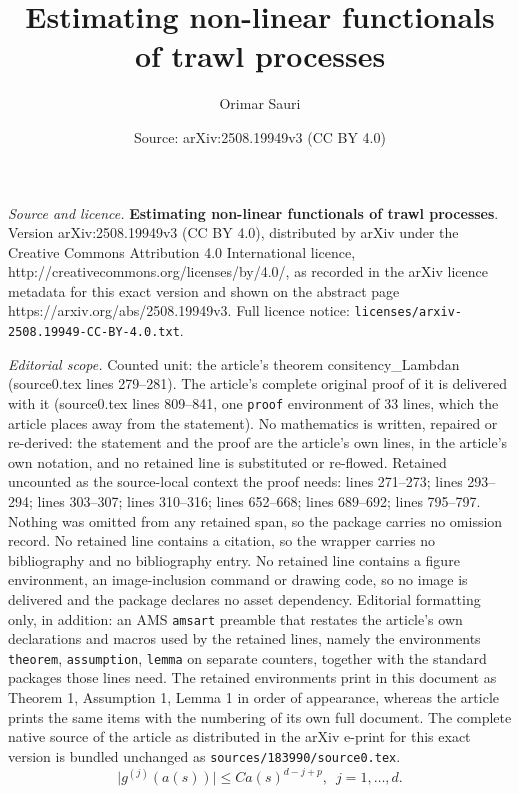 \documentclass[10pt,a4paper]{amsart}
\title{\textbf{Estimating non-linear functionals of trawl processes}}
\author{Orimar Sauri}
\date{Source: arXiv:2508.19949v3 (CC BY 4.0)}
\begin{document}
\maketitle

\noindent\emph{Source and licence.} \textbf{Estimating non-linear functionals of trawl processes}. Version arXiv:2508.19949v3 (CC BY 4.0), distributed by arXiv under the Creative Commons Attribution 4.0 International licence, http://creativecommons.org/licenses/by/4.0/, as recorded in the arXiv licence metadata for this exact version and shown on the abstract page https://arxiv.org/abs/2508.19949v3. Full licence notice: \texttt{licenses/arxiv-2508.19949-CC-BY-4.0.txt}.\par\smallskip

\noindent\textit{Editorial scope.} Counted unit: the article's theorem consitency\_Lambdan (source0.tex lines 279--281). The article's complete original proof of it is delivered with it (source0.tex lines 809--841, one \texttt{proof} environment of 33 lines, which the article places away from the statement). No mathematics is written, repaired or re-derived: the statement and the proof are the article's own lines, in the article's own notation, and no retained line is substituted or re-flowed.  Retained uncounted as the source-local context the proof needs: lines 271--273; lines 293--294; lines 303--307; lines 310--316; lines 652--668; lines 689--692; lines 795--797.  Nothing was omitted from any retained span, so the package carries no omission record.  No retained line contains a citation, so the wrapper carries no bibliography and no bibliography entry.  No retained line contains a figure environment, an image-inclusion command or drawing code, so no image is delivered and the package declares no asset dependency.  Editorial formatting only, in addition: an AMS \texttt{amsart} preamble that restates the article's own declarations and macros used by the retained lines, namely the environments \texttt{theorem}, \texttt{assumption}, \texttt{lemma} on separate counters, together with the standard packages those lines need.  The retained environments print in this document as Theorem 1, Assumption 1, Lemma 1 in order of appearance, whereas the article prints the same items with the numbering of its own full document.  The complete native source of the article as distributed in the arXiv e-print for this exact version is bundled unchanged as \texttt{sources/183990/source0.tex}.
			\begin{equation}
				\rvert g^{(j)}(a(s))\rvert\leq Ca(s)^{d-j+p},\,\,\,j=1,\ldots,d.\label{eq:boundsforg_gprime}
			\end{equation}
\end{document}
